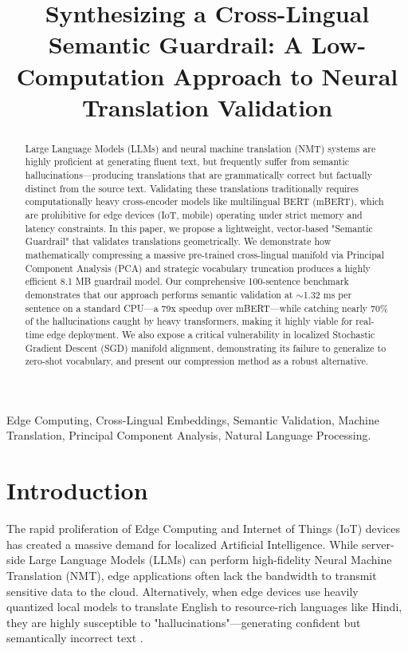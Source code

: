 \documentclass[conference]{IEEEtran}
\begin{document}
\title{Synthesizing a Cross-Lingual Semantic Guardrail: A Low-Computation Approach to Neural Translation Validation}

\author{
}

\maketitle

\begin{abstract}
Large Language Models (LLMs) and neural machine translation (NMT) systems are highly proficient at generating fluent text, but frequently suffer from semantic hallucinations—producing translations that are grammatically correct but factually distinct from the source text. Validating these translations traditionally requires computationally heavy cross-encoder models like multilingual BERT (mBERT), which are prohibitive for edge devices (IoT, mobile) operating under strict memory and latency constraints. In this paper, we propose a lightweight, vector-based "Semantic Guardrail" that validates translations geometrically. We demonstrate how mathematically compressing a massive pre-trained cross-lingual manifold via Principal Component Analysis (PCA) and strategic vocabulary truncation produces a highly efficient 8.1 MB guardrail model. Our comprehensive 100-sentence benchmark demonstrates that our approach performs semantic validation at $\sim$1.32 ms per sentence on a standard CPU—a 79x speedup over mBERT—while catching nearly 70\% of the hallucinations caught by heavy transformers, making it highly viable for real-time edge deployment. We also expose a critical vulnerability in localized Stochastic Gradient Descent (SGD) manifold alignment, demonstrating its failure to generalize to zero-shot vocabulary, and present our compression method as a robust alternative.
\end{abstract}

\begin{IEEEkeywords}
Edge Computing, Cross-Lingual Embeddings, Semantic Validation, Machine Translation, Principal Component Analysis, Natural Language Processing.
\end{IEEEkeywords}

\section{Introduction}
The rapid proliferation of Edge Computing and Internet of Things (IoT) devices has created a massive demand for localized Artificial Intelligence. While server-side Large Language Models (LLMs) can perform high-fidelity Neural Machine Translation (NMT), edge applications often lack the bandwidth to transmit sensitive data to the cloud. Alternatively, when edge devices use heavily quantized local models to translate English to resource-rich languages like Hindi, they are highly susceptible to "hallucinations"—generating confident but semantically incorrect text \cite{b1}.
\end{document}
